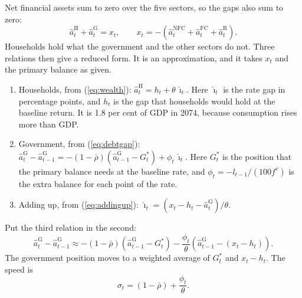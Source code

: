 \documentclass[11pt,a4paper]{article}
\newcommand{\row}{\mathrm{R}}
\newcommand{\gov}{\mathrm{G}}
\newcommand{\hh}{\mathrm{H}}
\begin{document}
Net financial assets sum to zero over the five sectors, so the gaps also sum to zero:
\begin{equation}
\hat{a}^{\hh}_t + \hat{a}^{\gov}_t = x_t , \qquad x_t = -\left( \hat{a}^{\mathrm{NFC}}_t + \hat{a}^{\mathrm{FC}}_t + \hat{a}^{\row}_t \right) .
\label{eq:addingup}
\end{equation}
Households hold what the government and the other sectors do not.
Three relations then give a reduced form. It is an approximation, and it takes $x_t$ and the primary balance as given.
\begin{enumerate}
\item Households, from (\ref{eq:wealth}): $\hat{a}^{\hh}_t = h_t + \theta\, \hat{\imath}_t$. Here $\hat{\imath}_t$ is the rate gap in percentage points, and $h_t$ is the gap that households would hold at the baseline return. It is 1.8 per cent of GDP in 2074, because consumption rises more than GDP.
\item Government, from (\ref{eq:debtgap}): $\hat{a}^{\gov}_t - \hat{a}^{\gov}_{t-1} = -(1-\bar{\rho}) (\hat{a}^{\gov}_{t-1} - G^*_t) + \phi_t\, \hat{\imath}_t$. Here $G^*_t$ is the position that the primary balance needs at the baseline rate, and $\phi_t = -l_{t-1}/(100 f^v)$ is the extra balance for each point of the rate.
\item Adding up, from (\ref{eq:addingup}): $\hat{\imath}_t = (x_t - h_t - \hat{a}^{\gov}_t)/\theta$.
\end{enumerate}
Put the third relation in the second:
\begin{equation}
\hat{a}^{\gov}_t - \hat{a}^{\gov}_{t-1} \approx
-(1-\bar{\rho}) \left( \hat{a}^{\gov}_{t-1} - G^*_t \right)
- \frac{\phi_t}{\theta} \left( \hat{a}^{\gov}_{t-1} - (x_t - h_t) \right) .
\label{eq:reduced}
\end{equation}
The government position moves to a weighted average of $G^*_t$ and $x_t - h_t$. The speed is
\begin{equation}
\sigma_t = (1-\bar{\rho}) + \frac{\phi_t}{\theta} .
\end{equation}
\end{document}
